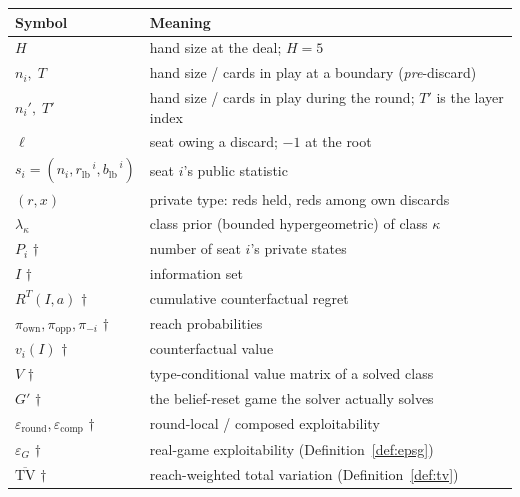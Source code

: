 \documentclass[11pt]{article}
\theoremstyle{plain}
\theoremstyle{definition}
\theoremstyle{remark}
\newcommand{\rlb}{\ensuremath{r_{\mathrm{lb}}}}
\newcommand{\blb}{\ensuremath{b_{\mathrm{lb}}}}
\newcommand{\reg}{\ensuremath{R}}
\newcommand{\infoset}{\ensuremath{I}}
\newcommand{\game}{\ensuremath{G}}
\newcommand{\gp}{\ensuremath{G'}}
\newcommand{\epsG}{\ensuremath{\varepsilon_{\game}}}
\begin{document}
\begin{center}\small
\begin{tabular}{@{}ll@{}}
\toprule
Symbol & Meaning\\
\midrule
$H$ & hand size at the deal; $H=5$\\
$n_i,\;T$ & hand size / cards in play at a boundary (\emph{pre}-discard)\\
$n_i',\;T'$ & hand size / cards in play during the round; $T'$ is the layer index\\
$\ell$ & seat owing a discard; $-1$ at the root\\
$s_i=(n_i,\rlb^{\,i},\blb^{\,i})$ & seat $i$'s public statistic\\
$(r,x)$ & private type: reds held, reds among own discards\\
$\lambda_\kappa$ & class prior (bounded hypergeometric) of class $\kappa$\\
$P_i$ $\dagger$ & number of seat $i$'s private states\\
$\infoset$ $\dagger$ & information set\\
$\reg^T(\infoset,a)$ $\dagger$ & cumulative counterfactual regret\\
$\pi_{\mathrm{own}},\pi_{\mathrm{opp}},\pi_{-i}$ $\dagger$ & reach probabilities\\
$v_i(\infoset)$ $\dagger$ & counterfactual value\\
$V$ $\dagger$ & type-conditional value matrix of a solved class\\
$\gp$ $\dagger$ & the belief-reset game the solver actually solves\\
$\varepsilon_{\text{round}},\varepsilon_{\text{comp}}$ $\dagger$ & round-local / composed exploitability\\
$\epsG$ $\dagger$ & real-game exploitability (Definition~\ref{def:epsg})\\
$\overline{\mathrm{TV}}$ $\dagger$ & reach-weighted total variation (Definition~\ref{def:tv})\\
\bottomrule
\end{tabular}
\end{center}
\end{document}
